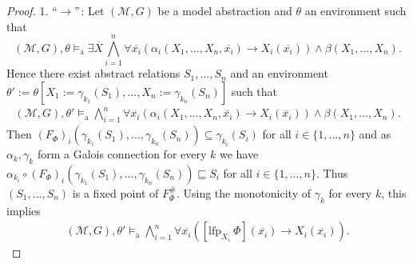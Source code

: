 \documentclass[acmsmall]{acmart}
\theoremstyle{plain}
\theoremstyle{definition}
\newcommand{\calM}{\mathcal{M}}
\newcommand{\mybar}[1]{\overline{#1}}
\newcommand{\impl}{\rightarrow} %
\newcommand{\lfp}{\mathrm{lfp}} %
\newcommand{\modelsa}{\models_\mathrm{a}} %
\begin{document}
\begin{proof}
	1. $``\rightarrow"$: Let $(\calM,G)$ be a model abstraction and $\theta$ an environment such that
	\[
	(\calM,G),\theta \modelsa \exists \mybar{X} \bigwedge_{i=1}^n \forall \mybar{x_i} \left(\alpha_i(X_1,...,X_n,\mybar{x_i}) \impl X_i(\mybar{x_i})\right) \wedge \beta(X_1,...,X_n).
	\]
	Hence there exist abstract relations $S_1,...,S_n$ and an environment $\theta' := \theta[X_1 := \gamma_{k_1}(S_1),...,X_n := \gamma_{k_n}(S_n)]$  such that 
	\begin{align}\label{abstractNonnengartproof}
		(\calM,G),\theta' \modelsa \bigwedge_{i=1}^n \forall \mybar{x_i} \left(\alpha_i(X_1,...,X_n,\mybar{x_i}) \impl X_i(\mybar{x_i})\right) \wedge \beta(X_1,...,X_n).
	\end{align}
Then $(F_{\Phi})_i(\gamma_{k_1}(S_1),...,\gamma_{k_n}(S_n)) \subseteq \gamma_{k_i}(S_i)$ for all $i \in \{1,...,n\}$ and as $\alpha_k,\gamma_k$ form a Galois connection for every $k$ we have $\alpha_{k_i} \circ (F_{\Phi})_i(\gamma_{k_1}(S_1),...,\gamma_{k_n}(S_n)) \sqsubseteq S_i$ for all $i \in \{1,...,n\}$. Thus $(S_1,...,S_n)$ is a fixed point of $F_{\Phi}^{\#}$. Using the monotonicity of $\gamma_k$ for every $k$, this implies
\begin{align}\label{abstactNonnengartproofPart2}
	(\calM,G),\theta' \modelsa \bigwedge_{i=1}^n \forall \mybar{x_i} ([\lfp_{X_i} ~\Phi](\mybar{x_i}) \impl X_i(\mybar{x_i})).
\end{align}


\end{proof}
\end{document}
